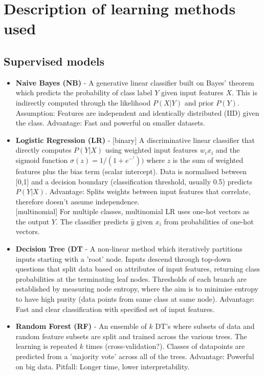 \documentclass[10pt, a4paper]{article}
\begin{document}
\section{Description of learning methods used}

\subsection{Supervised models}
\begin{itemize}
    \item \textbf{Naive Bayes (NB)} - A generative linear classifier built on Bayes' theorem which predicts the probability of class label $Y$ given input features $X$. This is indirectly computed through the likelihood $P(X|Y)$ and prior $P(Y)$. Assumption: Features are independent and identically distributed (IID) given the class. Advantage: Fast and powerful on smaller datasets.
    
    \item \textbf{Logistic Regression (LR)} - [binary] A discriminative linear classifier that directly computes $P(Y|X)$ using weighted input features $w_{i}x_{i}$ and the sigmoid function $σ(z) = 1/(1+e^-^z))$ where $z$ is the sum of weighted features plus the bias term (scalar intercept). Data is normalised between [0,1] and a decision boundary (classification threshold, usually 0.5) predicts $P(Y|X)$. Advantage: Splits weights between input features that correlate, therefore doesn't assume independence. \\
    
    [multinomial] For multiple classes, multinomial LR uses one-hot vectors as the output $Y$. The classifier predicts $\hat{y}$ given $x_{i}$ from probabilities of one-hot vectors.
    
    \item \textbf{Decision Tree (DT} - A non-linear method which iteratively partitions inputs starting with a 'root' node. Inputs descend through top-down questions that split data based on attributes of input features, returning class probabilities at the terminating leaf nodes. Thresholds of each branch are established by measuring node entropy, where the aim is to minimise entropy to have high purity (data points from same class at same node). Advantage: Fast and clear classification with specified set of input features.
    
    \item \textbf{Random Forest (RF)} - An ensemble of $k$ DT's where subsets of data and random feature subsets are split and trained across the various trees. The learning is repeated $k$ times (cross-validation?). Classes of datapoints are predicted from a 'majority vote' across all of the trees. Advantage: Powerful on big data. Pitfall: Longer time, lower interpretability.
\end{itemize}\\\
\end{document}
